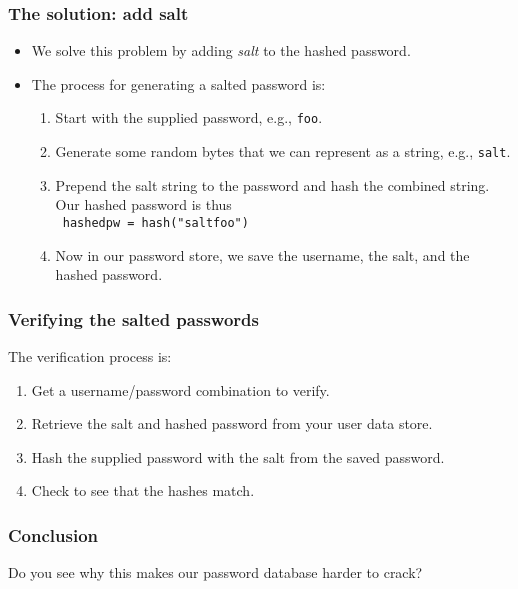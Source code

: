 \documentclass[10pt]{beamer}
\begin{document}
\begin{frame}
	\frametitle{The solution:  add salt}
	\begin{itemize}
		\item We solve this problem by adding \emph{salt} to the hashed password.
		\item The process for generating a salted password is:
			\begin{enumerate}
				\item Start with the supplied password, e.g., \texttt{foo}.
				\item Generate some random bytes that we can represent
					as a string, e.g., \texttt{salt}.
				\item Prepend the salt string to the password and hash 
					the combined string.  Our hashed password is thus \\
					\texttt{ hashedpw = hash("saltfoo")}
				\item Now in our password store, we save the username,
					the salt, and the hashed password.
			\end{enumerate}
	\end{itemize}
\end{frame}
\begin{frame}
	\frametitle{Verifying the salted passwords}
	The verification process is:
	\begin{enumerate}
		\item Get a username/password combination to verify.
		\item Retrieve the salt and hashed password from your
			user data store.
		\item Hash the supplied password with the salt from the saved password.
		\item Check to see that the hashes match.
	\end{enumerate}
\end{frame}
\begin{frame}
	\frametitle{Conclusion}

	Do you see why this makes our password database harder to crack?
\end{frame}
					
\end{document}
